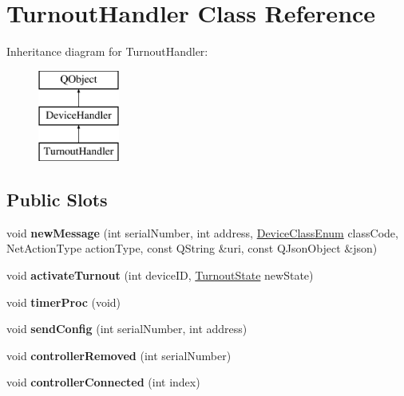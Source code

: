 \hypertarget{class_turnout_handler}{}\section{Turnout\+Handler Class Reference}
\label{class_turnout_handler}
Inheritance diagram for Turnout\+Handler\+:\begin{figure}[H]
\begin{center}
\leavevmode
\includegraphics[height=3.000000cm]{class_turnout_handler}
\end{center}
\end{figure}
\subsection*{Public Slots}
\begin{DoxyCompactItemize}
\item 
\mbox{\label{class_turnout_handler_aa6d1a7bce510b3d3bc092c83157ea9d7}} 
void {\bfseries new\+Message} (int serial\+Number, int address, \hyperlink{_global_defs_8h_ad17679fac69973be9b3a2787a60d7722}{Device\+Class\+Enum} class\+Code, Net\+Action\+Type action\+Type, const Q\+String \&uri, const Q\+Json\+Object \&json)
\item 
\mbox{\label{class_turnout_handler_af98a879c6e94f86901597f2204aafac2}} 
void {\bfseries activate\+Turnout} (int device\+ID, \hyperlink{_global_defs_8h_aaf453b54a68a7675a75e9149251d2570}{Turnout\+State} new\+State)
\item 
\mbox{\label{class_turnout_handler_ad250479f8c68d9195bbd6ae09bce2981}} 
void {\bfseries timer\+Proc} (void)
\item 
\mbox{\label{class_turnout_handler_ae2954780d7cf786caa6915102ca90fac}} 
void {\bfseries send\+Config} (int serial\+Number, int address)
\item 
\mbox{\label{class_turnout_handler_adfc83db04edca044530eb60d218df955}} 
void {\bfseries controller\+Removed} (int serial\+Number)
\item 
\mbox{\label{class_turnout_handler_af43378afbad7e068ad7e78dc4f1171bf}} 
void {\bfseries controller\+Connected} (int index)
\end{DoxyCompactItemize}
